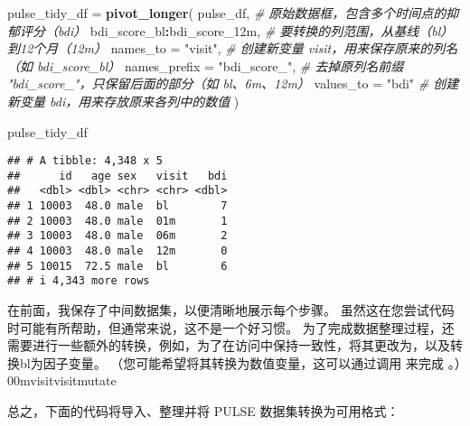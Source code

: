 \documentclass[
]{article}
\newenvironment{Shaded}{\begin{snugshade}}{\end{snugshade}}
\newcommand{\AttributeTok}[1]{\textcolor[rgb]{0.13,0.29,0.53}{#1}}
\newcommand{\CommentTok}[1]{\textcolor[rgb]{0.56,0.35,0.01}{\textit{#1}}}
\newcommand{\FunctionTok}[1]{\textcolor[rgb]{0.13,0.29,0.53}{\textbf{#1}}}
\newcommand{\NormalTok}[1]{#1}
\newcommand{\OtherTok}[1]{\textcolor[rgb]{0.56,0.35,0.01}{#1}}
\newcommand{\SpecialCharTok}[1]{\textcolor[rgb]{0.81,0.36,0.00}{\textbf{#1}}}
\newcommand{\StringTok}[1]{\textcolor[rgb]{0.31,0.60,0.02}{#1}}
\begin{document}
\begin{Shaded}
\begin{Highlighting}[]
\NormalTok{pulse\_tidy\_df }\OtherTok{=} 
  \FunctionTok{pivot\_longer}\NormalTok{(}
\NormalTok{    pulse\_df,                              }\CommentTok{\# 原始数据框，包含多个时间点的抑郁评分（bdi）}
\NormalTok{    bdi\_score\_bl}\SpecialCharTok{:}\NormalTok{bdi\_score\_12m,            }\CommentTok{\# 要转换的列范围，从基线（bl）到12个月（12m）}
    \AttributeTok{names\_to =} \StringTok{"visit"}\NormalTok{,                    }\CommentTok{\# 创建新变量 visit，用来保存原来的列名（如 bdi\_score\_bl）}
    \AttributeTok{names\_prefix =} \StringTok{"bdi\_score\_"}\NormalTok{,           }\CommentTok{\# 去掉原列名前缀 "bdi\_score\_"，只保留后面的部分（如 bl、6m、12m）}
    \AttributeTok{values\_to =} \StringTok{"bdi"}                      \CommentTok{\# 创建新变量 bdi，用来存放原来各列中的数值}
\NormalTok{  )}

\NormalTok{pulse\_tidy\_df}
\end{Highlighting}
\end{Shaded}

\begin{verbatim}
## # A tibble: 4,348 x 5
##      id   age sex   visit   bdi
##   <dbl> <dbl> <chr> <chr> <dbl>
## 1 10003  48.0 male  bl        7
## 2 10003  48.0 male  01m       1
## 3 10003  48.0 male  06m       2
## 4 10003  48.0 male  12m       0
## 5 10015  72.5 male  bl        6
## # i 4,343 more rows
\end{verbatim}

在前面，我保存了中间数据集，以便清晰地展示每个步骤。
虽然这在您尝试代码时可能有所帮助，但通常来说，这不是一个好习惯。
为了完成数据整理过程，还需要进行一些额外的转换，例如，为了在访问中保持一致性，将其更改为，以及转换bl为因子变量。
（您可能希望将其转换为数值变量，这可以通过调用 来完成
。）00mvisitvisitmutate

总之，下面的代码将导入、整理并将 PULSE 数据集转换为可用格式：
\end{document}
